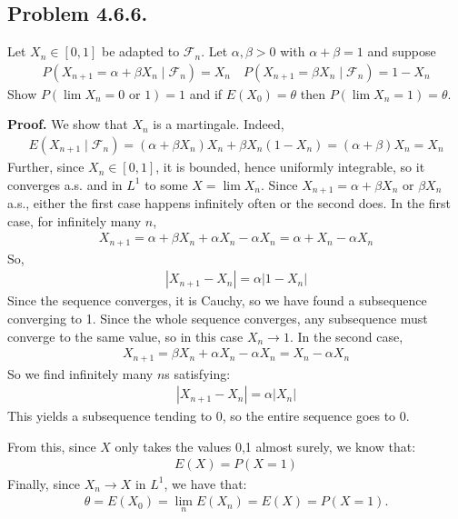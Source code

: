 \documentclass[12pt]{article}
\theoremstyle{definitionstyle}
\newcommand{\1}{\mathds 1}
\begin{document}
    \subsection*{Problem 4.6.6.}
    Let $X_n \in [0,1]$ be adapted to $\mathcal F_n$. Let $\alpha, \beta > 0$ with $\alpha + \beta = 1$ and suppose
    \begin{align*}
        P(X_{n+1} = \alpha + \beta X_n \mid \mathcal F_n) = X_n \quad P(X_{n+1} = \beta X_n \mid \mathcal F_n) = 1 - X_n
    \end{align*}
    Show $P(\lim X_n = 0 \text{ or } 1) = 1$ and if $E(X_0) = \theta$ then $P(\lim X_n = 1) = \theta$.

    \textbf{Proof.} 
    We show that $X_n$ is a martingale. Indeed, 
    \begin{align*}
        E(X_{n+1} \mid \mathcal F_n) = (\alpha + \beta X_n) X_n + \beta X_n (1-X_n) = (\alpha + \beta)X_n = X_n
    \end{align*}
    Further, since $X_n \in [0,1]$, it is bounded, hence uniformly integrable, so it converges a.s. and in $L^1$ to some $X = \lim X_n$. Since $X_{n+1} = \alpha + \beta X_n$ or $\beta X_n$ a.s., either the first case happens infinitely often or the second does. In the first case, for infinitely many $n$,
    \begin{align*}
        X_{n+1} = \alpha + \beta X_n + \alpha X_n - \alpha X_n = \alpha + X_n - \alpha X_n
    \end{align*}
    So,
    \begin{align*}
        |X_{n+1} - X_n| = \alpha |1 - X_n|
    \end{align*}
    Since the sequence converges, it is Cauchy, so we have found a subsequence converging to 1. Since the whole sequence converges, any subsequence must converge to the same value, so in this case $X_n \to 1$. In the second case,
    \begin{align*}
        X_{n+1} = \beta X_n + \alpha X_n - \alpha X_n = X_n - \alpha X_n
    \end{align*}
    So we find infinitely many $n$s satisfying:
    \begin{align*}
        |X_{n+1} - X_n| = \alpha |X_n|
    \end{align*}
    This yields a subsequence tending to 0, so the entire sequence goes to 0. 

    From this, since $X$ only takes the values 0,1 almost surely, we know that:
    \begin{align*}
        E(X) = P(X = 1)
    \end{align*}
    Finally, since $X_n \to X$ in $L^1$, we have that:
    \begin{align*}
        \theta = E(X_0) = \lim_n E(X_n) = E(X) = P(X = 1).
    \end{align*}
\end{document}
